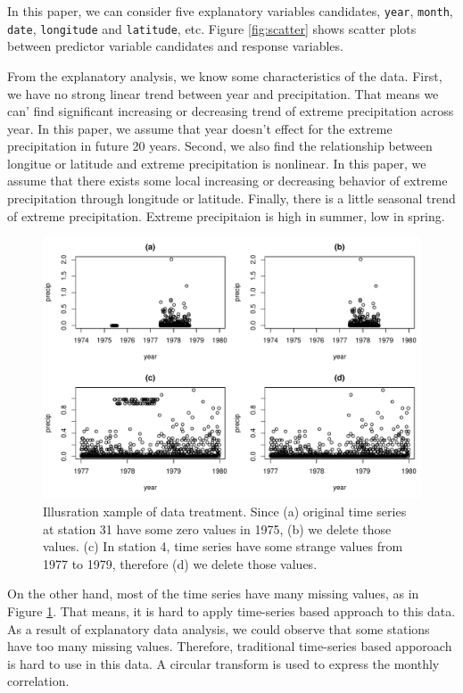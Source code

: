 \documentclass[11pt,titlepage]{article}
\begin{document}
	In this paper, we can consider five explanatory variables candidates, \texttt{year}, \texttt{month}, \texttt{date},  \texttt{longitude} and \texttt{latitude}, etc. Figure \ref{fig:scatter} shows scatter plots between predictor variable candidates and response variables. \

	From the explanatory analysis, we know some characteristics of the data. First, we have no strong linear trend between year and precipitation. That means we can' find significant increasing or decreasing trend of extreme precipitation across year. In this paper, we assume that year doesn't effect for the extreme precipitation in future 20 years. Second, we also find the relationship between longitue or latitude and extreme precipitation is nonlinear. In this paper, we assume that there exists some local increasing or decreasing behavior of extreme precipitation through longitude or latitude. Finally, there is a little seasonal trend of extreme precipitation. Extreme precipitaion is high in summer, low in spring.
	
	\begin{figure}[h!]
		\centering
		\includegraphics[scale=0.75]{Missing.pdf}
		\caption{Illusration xample of data treatment. Since (a) original time series at station 31 have some zero values in 1975, (b) we delete those values. (c) In station 4, time series have some strange values from 1977 to 1979, therefore (d) we delete those values.}
		\label{fig:DTM}
	\end{figure}
	
	On the other hand, most of the time series have many missing values, as in Figure \ref{fig:DTM}. That means, it is hard to apply time-series based approach to this data. As a result of explanatory data analysis, we could observe that some stations have too many missing values. Therefore, traditional time-series based apporoach is hard to use in this data. A circular transform is used to express the monthly correlation.
	
\end{document}
